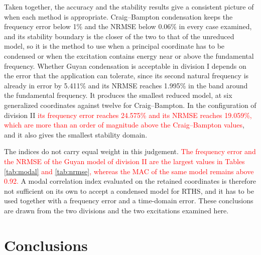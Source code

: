 \documentclass[11pt,a4paper]{article}
\numberwithin{equation}{section}
\newcommand{\rev}[1]{\textcolor{red}{#1}}
\begin{document}
Taken together, the accuracy and the stability results give a consistent picture of when each method is appropriate. Craig--Bampton condensation keeps the frequency error below 1\% and the NRMSE below 0.06\% in every case examined, and its stability boundary is the closer of the two to that of the unreduced model, so it is the method to use when a principal coordinate has to be condensed or when the excitation contains energy near or above the fundamental frequency. Whether Guyan condensation is acceptable in division I depends on the error that the application can tolerate, since its second natural frequency is already in error by 5.411\% and its NRMSE reaches 1.995\% in the band around the fundamental frequency. It produces the smallest reduced model, at six generalized coordinates against twelve for Craig--Bampton. In the configuration of division II \rev{its frequency error reaches 24.575\% and its NRMSE reaches 19.059\%, which are more than an order of magnitude above the Craig--Bampton values}, and it also gives the smallest stability domain.

The indices do not carry equal weight in this judgement. \rev{The frequency error and the NRMSE of the Guyan model of division II are the largest values in Tables \ref{tab:modal} and \ref{tab:nrmse}, whereas the MAC of the same model remains above 0.92.} A modal correlation index evaluated on the retained coordinates is therefore not sufficient on its own to accept a condensed model for RTHS, and it has to be used together with a frequency error and a time-domain error. These conclusions are drawn from the two divisions and the two excitations examined here.




\section{Conclusions} \label{sec6}
\end{document}
